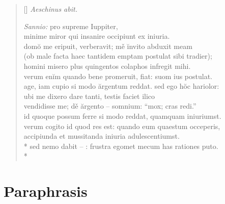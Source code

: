 \begin{verse}[\versewidth]
    \textit{Aeschinus abit.}

                \textit{Sannio:} pro supreme Iuppiter,\\
    minime miror qui insanire occipiunt ex iniuria.\\
    domŏ me eripuit, verberavit; mě ĭnvito abduxit meam\\
    (ob male facta haec tantidem emptam postulat sibi tradier);\\
    homini misero plus quingentos colaphos infregit mihi.\\
    verum enĭm quando bene promeruit, fiat: suom ius postulat.\\
    age, iam cupio si modo ărgentum reddat. sed ego hŏc hariolor:\\
    ubi me dixero dare tanti, testis faciet ilico\\
    vendidisse me; dě ărgento – somnium: ``mox; cras redi.''\\
    id quoque possum ferre si modo reddat, quamquam iniuriumst.\\
    verum cogito id quod res est: quando eum quaestum occeperis,\\
    accipiunda et mussitanda iniuria adulescentiumst.\\*
    sed nemo dabit – : frustra egomet mecum has rationes puto.\\*
\end{verse}


\section*{Paraphrasis}


